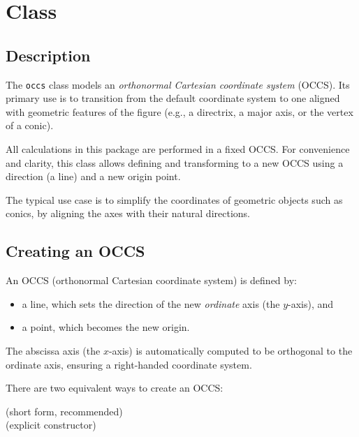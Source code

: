 \newpage
\section{Class } %
\label{sec:orthonormal_cartesian_coordinate_system}

\subsection{Description} %
\label{sub:description_occs}

The \texttt{occs} class models an \emph{orthonormal Cartesian coordinate system} (OCCS). Its primary use is to transition from the default coordinate system to one aligned with geometric features of the figure (e.g., a directrix, a major axis, or the vertex of a conic).

All calculations in this package are performed in a fixed OCCS. For convenience and clarity, this class allows defining and transforming to a new OCCS using a direction (a line) and a new origin point.

\medskip
\noindent
The typical use case is to simplify the coordinates of geometric objects such as conics, by aligning the axes with their natural directions.


\subsection{Creating an OCCS} %
\label{sub:creating_occs}

An OCCS (orthonormal Cartesian coordinate system) is defined by:
\begin{itemize}
  \item a line, which sets the direction of the new \emph{ordinate} axis (the $y$-axis), and
  \item a point, which becomes the new origin.
\end{itemize}

The abscissa axis (the $x$-axis) is automatically computed to be orthogonal to the ordinate axis, ensuring a right-handed coordinate system.

\medskip
\noindent
There are two equivalent ways to create an OCCS:

\begin{mybox}
   \hfill (short form, recommended)  
  \\
   \hfill (explicit constructor)
\end{mybox}

